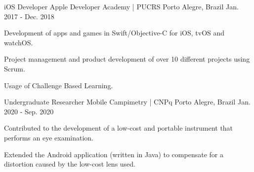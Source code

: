 \begin{cventries}
  \cventry
    {iOS Developer}
    {Apple Developer Academy | PUCRS}
    {Porto Alegre, Brazil}
    {Jan. 2017 - Dec. 2018}
    {
      \begin{cvitems}
        \item {Development of apps and games in Swift/Objective-C for iOS, tvOS and watchOS.}
        \item {Project management and product development of over 10 different projects using Scrum.}
        \item {Usage of Challenge Based Learning.}
      \end{cvitems}
    }

    \cventry
      {Undergraduate Researcher}
      {Mobile Campimetry | CNPq}
      {Porto Alegre, Brazil}
      {Jan. 2020 - Sep. 2020}
      {
        \begin{cvitems}
          \item {Contributed to the development of a low-cost and portable instrument that performs an eye examination.}
          \item {Extended the Android application (written in Java) to compensate for a distortion caused by the low-cost lens used.}
        \end{cvitems}
      }
\end{cventries}
